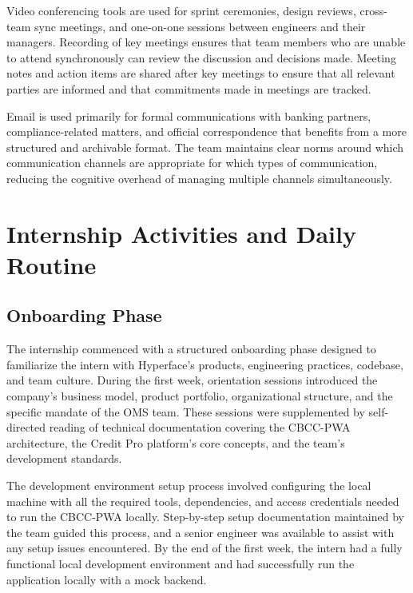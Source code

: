 Video conferencing tools are used for sprint ceremonies, design reviews, cross-team sync meetings, and one-on-one sessions between engineers and their managers. Recording of key meetings ensures that team members who are unable to attend synchronously can review the discussion and decisions made. Meeting notes and action items are shared after key meetings to ensure that all relevant parties are informed and that commitments made in meetings are tracked.

Email is used primarily for formal communications with banking partners, compliance-related matters, and official correspondence that benefits from a more structured and archivable format. The team maintains clear norms around which communication channels are appropriate for which types of communication, reducing the cognitive overhead of managing multiple channels simultaneously.

\section{Internship Activities and Daily Routine}

\subsection{Onboarding Phase}

The internship commenced with a structured onboarding phase designed to familiarize the intern with Hyperface's products, engineering practices, codebase, and team culture. During the first week, orientation sessions introduced the company's business model, product portfolio, organizational structure, and the specific mandate of the OMS team. These sessions were supplemented by self-directed reading of technical documentation covering the CBCC-PWA architecture, the Credit Pro platform's core concepts, and the team's development standards.

The development environment setup process involved configuring the local machine with all the required tools, dependencies, and access credentials needed to run the CBCC-PWA locally. Step-by-step setup documentation maintained by the team guided this process, and a senior engineer was available to assist with any setup issues encountered. By the end of the first week, the intern had a fully functional local development environment and had successfully run the application locally with a mock backend.

